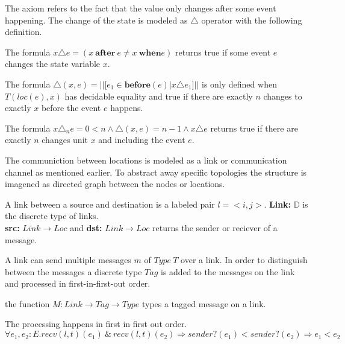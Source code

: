 The axiom refers to the fact that the value only changes after some event
happening. The change of the state is modeled as $\triangle$ operator with the
following definition.~\cite{bickford2005causal}

\begin{defi}
  The formula $x\triangle e = (x\ \textbf{after}\ e\ne x\ \textbf{when} e)$ returns true
  if some event $e$ changes the state variable $x$.
\end{defi}

\begin{defi}
  The formula $\triangle (x,e) = ||[e_1\in \textbf{before}(e)|x\triangle e_1]||$ is only defined when
  $T(loc(e),x)$ has decidable equality and true if there are exactly $n$ changes to
  exactly $x$ before the event $e$ happens.  
\end{defi}

\begin{defi}
  The formula $x\triangle_n e = 0<n\wedge \triangle (x,e)=n-1\wedge x\triangle e$ returns true if there are
  exactly $n$ changes unit $x$ and including the event $e$.
\end{defi}

The communiction between locations is modeled as a link or communication
channel as mentioned earlier. To abstract away specific topologies the structure
is imagened as directed graph between the nodes or locations.~\cite{bickford2005causal}

\begin{defi}
  A link between a source and destination is a labeled pair $l=<i,j>$.
  \textbf{Link:} $\mathbb{D}$ is the discrete type of links.\\
  \textbf{src:} $Link\rightarrow Loc$ and \textbf{dst:} $Link\rightarrow Loc$ returns the sender
  or reciever of a message.
\end{defi}

A link can send multiple messages $m$ of $Type\ T$ over a link.
In order to distinguish between the messages a discrete type $Tag$
is added to the messages on the link and processed in first-in-first-out order.~\cite{bickford2005causal}

\begin{defi}
  the function $M:Link\rightarrow Tag\rightarrow Type$ types a tagged message on a link.
\end{defi}

\begin{axiom}
  The processing happens in first in first out order.\\
  $\forall e_1,e_2:E.recv(l,t)(e_1)\ \&\ recv(l,t)(e_2) \Rightarrow sender?(e_1)<sender?(e_2)\Rightarrow e_1<e_2$
\end{axiom}

